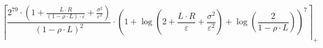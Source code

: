 \[\left\lceil \frac{2^{79} \cdot \left(1 + \frac{L \cdot R}{\left(1 - \rho \cdot L\right) \cdot \varepsilon} + \frac{\sigma^{2}}{\varepsilon^{2}}\right)}{\left(1 - \rho \cdot L\right)^{2}} \cdot \left(1 + \log\left(2 + \frac{L \cdot R}{\varepsilon} + \frac{\sigma^{2}}{\varepsilon^{2}}\right) + \log\left(\frac{2}{1 - \rho \cdot L}\right)\right)^{7} \right\rceil_{+}\]
